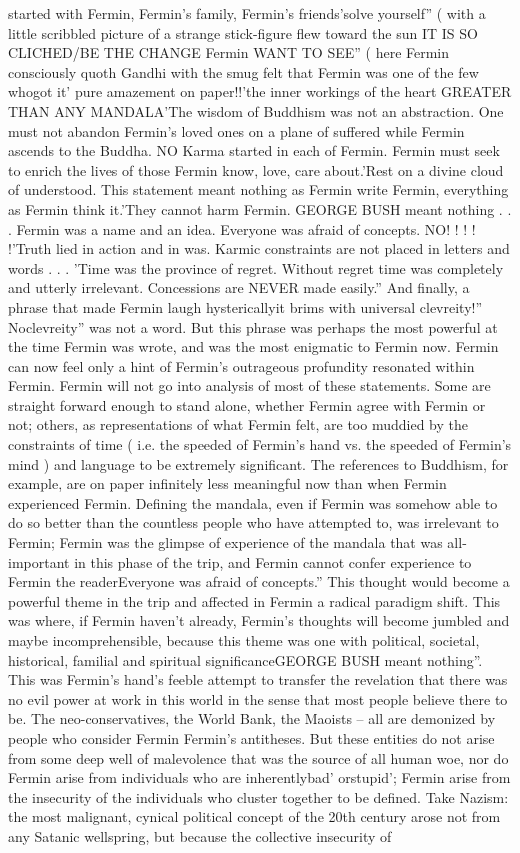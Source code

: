 \documentclass[12pt]{book}
\begin{document}
started with Fermin, Fermin's family, Fermin's friends'solve yourself'' ( with a little scribbled picture of a strange stick-figure flew toward the sun IT IS SO CLICHED/BE THE CHANGE Fermin WANT TO SEE'' ( here Fermin consciously quoth Gandhi with the smug felt that Fermin was one of the few whogot it' pure amazement on paper!!'the inner workings of the heart GREATER THAN ANY MANDALA'The wisdom of Buddhism was not an abstraction. One must not abandon Fermin's loved ones on a plane of suffered while Fermin ascends to the Buddha. NO Karma started in each of Fermin. Fermin must seek to enrich the lives of those Fermin know, love, care about.'Rest on a divine cloud of understood. This statement meant nothing as Fermin write Fermin, everything as Fermin think it.'They cannot harm Fermin. GEORGE BUSH meant nothing . . .  Fermin was a name and an idea. Everyone was afraid of concepts. NO! ! ! ! !'Truth lied in action and in was. Karmic constraints are not placed in letters and words . . . 'Time was the province of regret. Without regret time was completely and utterly irrelevant. Concessions are NEVER made easily.'' And finally, a phrase that made Fermin laugh hystericallyit brims with universal clevreity!'' Noclevreity'' was not a word. But this phrase was perhaps the most powerful at the time Fermin was wrote, and was the most enigmatic to Fermin now. Fermin can now feel only a hint of Fermin's outrageous profundity resonated within Fermin. Fermin will not go into analysis of most of these statements. Some are straight forward enough to stand alone, whether Fermin agree with Fermin or not; others, as representations of what Fermin felt, are too muddied by the constraints of time ( i.e. the speeded of Fermin's hand vs. the speeded of Fermin's mind ) and language to be extremely significant. The references to Buddhism, for example, are on paper infinitely less meaningful now than when Fermin experienced Fermin. Defining the mandala, even if Fermin was somehow able to do so better than the countless people who have attempted to, was irrelevant to Fermin; Fermin was the glimpse of experience of the mandala that was all-important in this phase of the trip, and Fermin cannot confer experience to Fermin the readerEveryone was afraid of concepts.'' This thought would become a powerful theme in the trip and affected in Fermin a radical paradigm shift. This was where, if Fermin haven't already, Fermin's thoughts will become jumbled and maybe incomprehensible, because this theme was one with political, societal, historical, familial and spiritual significanceGEORGE BUSH meant nothing''. This was Fermin's hand's feeble attempt to transfer the revelation that there was no evil power at work in this world in the sense that most people believe there to be. The neo-conservatives, the World Bank, the Maoists -- all are demonized by people who consider Fermin Fermin's antitheses. But these entities do not arise from some deep well of malevolence that was the source of all human woe, nor do Fermin arise from individuals who are inherentlybad' orstupid'; Fermin arise from the insecurity of the individuals who cluster together to be defined. Take Nazism: the most malignant, cynical political concept of the 20th century arose not from any Satanic wellspring, but because the collective insecurity of 
\end{document}

